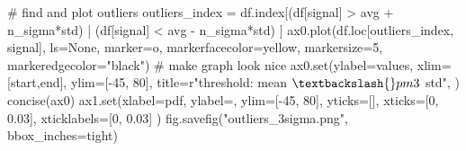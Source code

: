 \documentclass[
  letterpaper,
  DIV=11,
  numbers=noendperiod,
  oneside]{scrreprt}
\newenvironment{Shaded}{\begin{snugshade}}{\end{snugshade}}
\newcommand{\BuiltInTok}[1]{\textcolor[rgb]{0.00,0.23,0.31}{#1}}
\newcommand{\CommentTok}[1]{\textcolor[rgb]{0.37,0.37,0.37}{#1}}
\newcommand{\DecValTok}[1]{\textcolor[rgb]{0.68,0.00,0.00}{#1}}
\newcommand{\FloatTok}[1]{\textcolor[rgb]{0.68,0.00,0.00}{#1}}
\newcommand{\NormalTok}[1]{\textcolor[rgb]{0.00,0.23,0.31}{#1}}
\newcommand{\OperatorTok}[1]{\textcolor[rgb]{0.37,0.37,0.37}{#1}}
\newcommand{\StringTok}[1]{\textcolor[rgb]{0.13,0.47,0.30}{#1}}
\newcommand{\VerbatimStringTok}[1]{\textcolor[rgb]{0.13,0.47,0.30}{#1}}
\begin{document}
\begin{Shaded}
\begin{Highlighting}[]
\CommentTok{\# find and plot outliers}
\NormalTok{outliers\_index }\OperatorTok{=}\NormalTok{ df.index[(df[}\StringTok{\textquotesingle{}signal\textquotesingle{}}\NormalTok{] }\OperatorTok{\textgreater{}}\NormalTok{ avg }\OperatorTok{+}\NormalTok{ n\_sigma}\OperatorTok{*}\NormalTok{std) }\OperatorTok{|} 
\NormalTok{                          (df[}\StringTok{\textquotesingle{}signal\textquotesingle{}}\NormalTok{] }\OperatorTok{\textless{}}\NormalTok{ avg }\OperatorTok{{-}}\NormalTok{ n\_sigma}\OperatorTok{*}\NormalTok{std)}
\NormalTok{                         ]}
\NormalTok{ax0.plot(df.loc[outliers\_index, }\StringTok{\textquotesingle{}signal\textquotesingle{}}\NormalTok{], ls}\OperatorTok{=}\StringTok{\textquotesingle{}None\textquotesingle{}}\NormalTok{,}
\NormalTok{        marker}\OperatorTok{=}\StringTok{\textquotesingle{}o\textquotesingle{}}\NormalTok{, markerfacecolor}\OperatorTok{=}\StringTok{\textquotesingle{}yellow\textquotesingle{}}\NormalTok{, markersize}\OperatorTok{=}\DecValTok{5}\NormalTok{,}
\NormalTok{        markeredgecolor}\OperatorTok{=}\StringTok{"black"}\NormalTok{)}
\CommentTok{\# make graph look nice}
\NormalTok{ax0.}\BuiltInTok{set}\NormalTok{(ylabel}\OperatorTok{=}\StringTok{\textquotesingle{}values\textquotesingle{}}\NormalTok{,}
\NormalTok{       xlim}\OperatorTok{=}\NormalTok{[start,end],}
\NormalTok{       ylim}\OperatorTok{=}\NormalTok{[}\OperatorTok{{-}}\DecValTok{45}\NormalTok{, }\DecValTok{80}\NormalTok{],}
\NormalTok{       title}\OperatorTok{=}\VerbatimStringTok{r"threshold: mean $\textbackslash{}pm3$ std"}\NormalTok{,}
\NormalTok{       )}
\NormalTok{concise(ax0)}
\NormalTok{ax1.}\BuiltInTok{set}\NormalTok{(xlabel}\OperatorTok{=}\StringTok{\textquotesingle{}pdf\textquotesingle{}}\NormalTok{,}
\NormalTok{        ylabel}\OperatorTok{=}\StringTok{\textquotesingle{}\textquotesingle{}}\NormalTok{,}
\NormalTok{        ylim}\OperatorTok{=}\NormalTok{[}\OperatorTok{{-}}\DecValTok{45}\NormalTok{, }\DecValTok{80}\NormalTok{],}
\NormalTok{        yticks}\OperatorTok{=}\NormalTok{[],}
\NormalTok{        xticks}\OperatorTok{=}\NormalTok{[}\DecValTok{0}\NormalTok{, }\FloatTok{0.03}\NormalTok{],}
\NormalTok{        xticklabels}\OperatorTok{=}\NormalTok{[}\StringTok{\textquotesingle{}0\textquotesingle{}}\NormalTok{, }\StringTok{\textquotesingle{}0.03\textquotesingle{}}\NormalTok{]}
\NormalTok{        )}
\NormalTok{fig.savefig(}\StringTok{"outliers\_3sigma.png"}\NormalTok{, bbox\_inches}\OperatorTok{=}\StringTok{\textquotesingle{}tight\textquotesingle{}}\NormalTok{)}
\end{Highlighting}
\end{Shaded}
\end{document}

